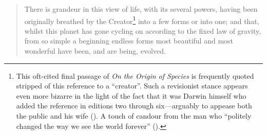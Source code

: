 \documentclass{tufte-book}
\begin{document}






\begin{quotation}
  There is grandeur in this view of life, with its several powers, having been
  originally breathed by the Creator\footnote{This \mbox{oft-cited} final
    passage of \emph{On the Origin of Species} is frequently quoted stripped of
    this reference to a ``creator''.  Such a revisionist stance appears even
    more bizarre in the light of the fact that it was Darwin himself who added
    the reference in editions two through six---arguably to appease both the
    public and his wife (\citealp{thompson_origin_2003}).  A touch of candour
    from the man who ``politely changed the way we see the world forever''
    (\citealp{rutherford_there_2008}).} into a few forms or into one; and that,
  whilst this planet has gone cycling on according to the fixed law of gravity,
  from so simple a beginning endless forms most beautiful and most wonderful
  have been, and are being, evolved.
\end{quotation}
\end{document}
